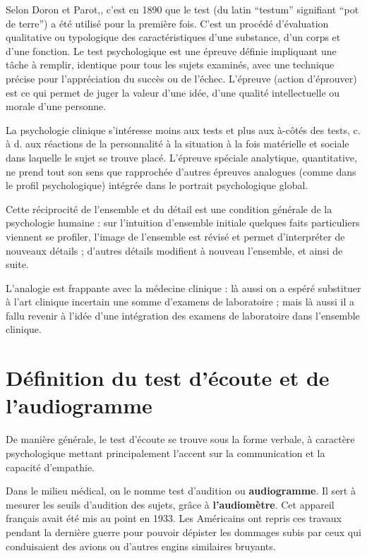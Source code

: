 Selon Doron et Parot,\autocite {doronparot}, c'est en 1890 que le test (du latin ``testum''
signifiant ``pot de terre'') a été utilisé pour la
première fois. C'est un procédé d'évaluation qualitative ou
typologique des caractéristiques d'une substance, d'un corps et d'une
fonction.
Le test psychologique est une épreuve définie impliquant une tâche à
remplir, identique pour tous les sujets examinés, avec une technique
précise pour l'appréciation du succès ou de l'échec.
L'épreuve (action d'éprouver) est ce qui permet de juger la valeur
d'une idée, d'une qualité intellectuelle ou morale d'une personne.

La psychologie clinique s’intéresse moins
aux tests et plus aux à-côtés des tests, c. à d. aux réactions de la
personnalité à la situation à la fois matérielle et sociale dans
laquelle le sujet se trouve placé. L’épreuve spéciale analytique,
quantitative, ne prend tout son sens que rapprochée d’autres épreuves
analogues (comme dans le profil psychologique) intégrée dans le
portrait psychologique global.

Cette réciprocité de l’ensemble et du détail est une condition générale de la psychologie humaine : sur l’intuition d’ensemble initiale quelques faits particuliers viennent se profiler, l’image de l’ensemble est révisé et permet d’interpréter de nouveaux détails ; d’autres détails modifient à nouveau l’ensemble, et ainsi de suite.


L’analogie est frappante avec la médecine clinique : là aussi on a
espéré substituer à l’art clinique incertain une somme d’examens de
laboratoire ; mais là aussi il a fallu revenir à l’idée d’une
intégration des examens de laboratoire dans l’ensemble clinique.



\section{Définition du test d'écoute et de l'audiogramme}

De manière générale, le test d'écoute se trouve sous la forme verbale,
à caractère  
psychologique mettant principalement l'accent sur la communication
et la capacité d'empathie.

Dans le milieu médical, on le nomme test d'audition ou \textbf{audiogramme}. Il
sert à mesurer les seuils d'audition des sujets, grâce à\textbf{ l'audiomètre}. Cet 
appareil français avait été mis au point en 1933. Les Américains
ont repris ces travaux pendant la dernière guerre pour pouvoir dépister
les dommages subis par ceux qui conduisaient des avions ou d'autres
engins similaires bruyants.



